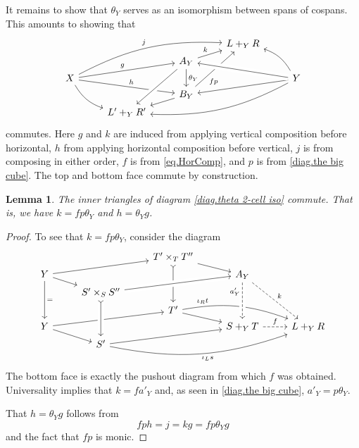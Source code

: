 \documentclass[11pt]{amsart}
\newtheorem{lem}[thm]{Lemma}
\theoremstyle{remark}
\theoremstyle{definition}
\begin{document}
It remains to show that $\theta_Y$ serves as 
an isomorphism between spans of cospans. This 
amounts to showing that
%
\begin{equation} 
\label{diag.theta 2-cell iso}
\begin{tikzcd}[column sep=2.5em,row sep=.2em]
	{} & 
	{} & 
	{} & 
	{L+_YR} & 
	{} \\
	{} & 
	{} & 
	{A_Y} 
		\ar[ur, "k"]
		\ar[dd,"\theta_Y"]& 
	{} & 
	{} \\
	{X} 
		\ar[uurrr, bend left=15,"j"]
		\ar[urr,"g"]
		\ar[drr,"h"]
		\ar[ddr, bend right=20] & 
	{} & 
	{} & 
	{} & 
	{Y} 
		\ar[uul, bend right=20]
		\ar[dll]
		\ar[ddlll, bend left=15] \\
	{} & 
	{} & 
	{B_Y} 
		\ar[uuur,swap, "fp", pos=.3]
		\ar[ld]& 
	{} & 
	{} \\
	{} & 
	{L'+_YR'} & 
	{} & 
	{} & 
	{} 
		\ar[from=2-3,to=5-2,crossing over] 
		\ar[from=3-5,to=2-3,crossing over]
\end{tikzcd}
\end{equation}
%
commutes. Here $g$ and $k$ are induced from applying vertical composition before horizontal, $h$ from applying horizontal composition before vertical, $j$ is from composing in either order, $f$ is from \eqref{eq.HorComp}, and $p$ is from \eqref{diag.the big cube}.  The top and bottom face commute by construction.
%
%
%
%
%
%

\begin{lem}
	The inner triangles of diagram \eqref{diag.theta 2-cell iso} commute. That is, we have $k=fp \theta_Y$ and $h=\theta_Yg$.
\end{lem}
%
\begin{proof}
	To see that $k=fp\theta_Y$, consider the diagram
	\[
	\begin{tikzcd}[column sep=2.5em,row sep=.2em]
	{} 
	& {} 
	& {T'\times_TT''} 	
	\ar[ddd,rightarrowtail]
	\ar[rd] 
	& {} 
	& {} 
	\\ {Y}
		\ar[rru]
		\ar[rd]
		\ar[ddd,"="] 
	& {} 
	& {} 
	& {A_Y}  
		\ar[dddr,dashed,"k"]
	& {} 
	\\ {} 
	& {S'\times_SS''} 
		\ar[rru,crossing over]
	& {} 
	& {} 
	& {} 
	\\ {} 
	& {} 
	& {T'} 
		\ar[dr] 
		\ar[rrd,bend left=15,pos=.25,"\iota_R t"]
	& {} 
	& {} 
	\\ {Y} 
		\ar[rru]
		\ar[rd]
	& {} 
	& {} 
	& {S+_YT} 
		\ar[r,dashed,"f"]
	& {L+_YR} 
	\\ {} 
	& {S'} 
		\ar[rru] 
		\ar[rrru,bend right=15,swap,"\iota_L s"]
	& {} 
	& {} 
	& {} 
		\ar[from=3-2,to=6-2,crossing over,rightarrowtail]
		\ar[from=2-4,to=5-4,dashed,crossing over,pos=.25, "a'_Y"']
	\end{tikzcd}
	\]
	The bottom face is exactly the pushout diagram from which $f$ was obtained.  Universality implies that $k = f a'_Y$ and, as seen in \eqref{diag.the big cube}, $a'_Y = p \theta_Y$. 
	
	That $h=\theta_Yg$ follows from 
	\[
		fph=j=kg=fp\theta_Yg
	\] 
	and the fact that $fp$ is monic.
\end{proof}
\end{document}
